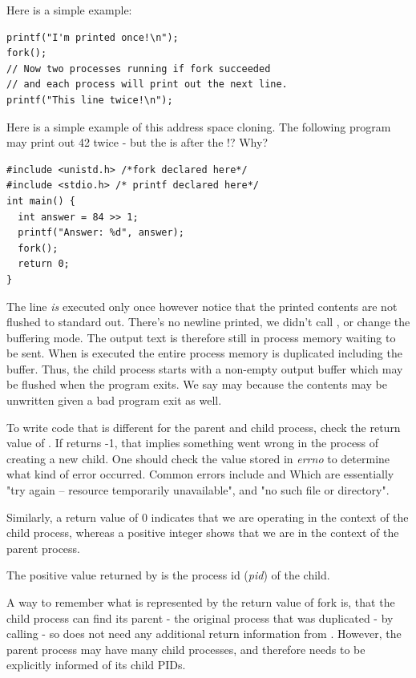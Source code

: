 Here is a simple example:

\begin{verbatim}
printf("I'm printed once!\n");
fork();
// Now two processes running if fork succeeded
// and each process will print out the next line.
printf("This line twice!\n");
\end{verbatim}

Here is a simple example of this address space cloning.
The following program may print out 42 twice - but the  is after the !? Why?

\begin{verbatim}
#include <unistd.h> /*fork declared here*/
#include <stdio.h> /* printf declared here*/
int main() {
  int answer = 84 >> 1;
  printf("Answer: %d", answer);
  fork();
  return 0;
}
\end{verbatim}

The  line \emph{is} executed only once however notice that the printed contents are not flushed to standard out.
There's no newline printed, we didn't call , or change the buffering mode.
The output text is therefore still in process memory waiting to be sent.
When  is executed the entire process memory is duplicated including the buffer.
Thus, the child process starts with a non-empty output buffer which may be flushed when the program exits.
We say may because the contents may be unwritten given a bad program exit as well.

To write code that is different for the parent and child process, check the return value of .
If  returns -1, that implies something went wrong in the process of creating a new child.
One should check the value stored in \emph{errno} to determine what kind of error occurred.
Common errors include  and  Which are essentially "try again -- resource temporarily unavailable", and "no such file or directory".

Similarly, a return value of 0 indicates that we are operating in the context of the child process, whereas a positive integer shows that we are in the context of the parent process.

The positive value returned by  is the process id (\emph{pid}) of the child.

A way to remember what is represented by the return value of fork is, that the child process can find its parent - the original process that was duplicated - by calling  - so does not need any additional return information from . However, the parent process may have many child processes, and therefore needs to be explicitly informed of its child PIDs.

